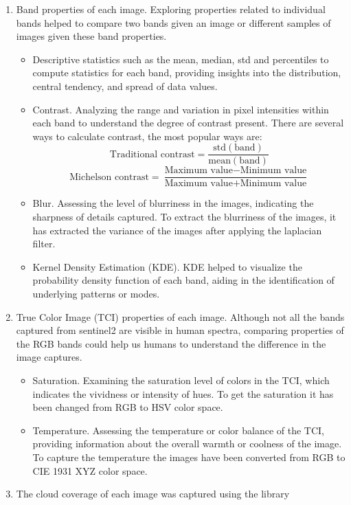 \documentclass[11pt, a4paper]{article}
\begin{document}
	\begin{enumerate}
		\item Band properties of each image. Exploring properties related to individual bands helped to compare two bands given an image or different samples of images given these band properties.
		\begin{itemize}
			\item Descriptive statistics such as the mean, median, std and percentiles to compute  statistics for each band, providing insights into the distribution, central tendency, and spread of data values.
			\item Contrast. Analyzing the range and variation in pixel intensities within each band to understand the degree of contrast present. There are several ways to calculate contrast, the most popular ways are:
			\[\text{Traditional contrast} = \frac{\text{std}(\text{band})}{\text{mean}(\text{band})}\]
			\[\text{Michelson contrast} = \frac{\text{Maximum value} - \text{Minimum value}}{\text{Maximum value} + \text{Minimum value}}\]
			\item Blur. Assessing the level of blurriness in the images, indicating the sharpness of details captured. To extract the blurriness of the images, it has extracted the variance of the images after applying the laplacian filter.
			\item Kernel Density Estimation (KDE). KDE helped to visualize the probability density function of each band, aiding in the identification of underlying patterns or modes.
		\end{itemize}
		\item True Color Image (TCI) properties of each image. Although not all the bands captured from sentinel2 are visible in human spectra, comparing properties of the RGB bands could help us humans to understand the difference in the image captures.
		\begin{itemize}
			\item Saturation. Examining the saturation level of colors in the TCI, which indicates the vividness or intensity of hues. To get the saturation it has been changed from RGB to HSV color space.
			\item Temperature. Assessing the temperature or color balance of the TCI, providing information about the overall warmth or coolness of the image. To capture the temperature the images have been converted from RGB to CIE 1931 XYZ color space.
		\end{itemize}
		\item  The cloud coverage of each image was captured using the library  

\end{enumerate}
\end{document}
